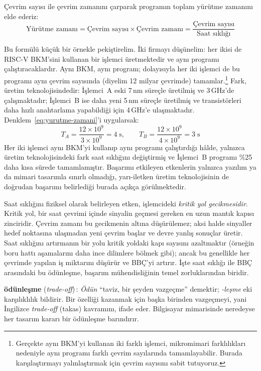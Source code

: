 Çevrim sayısı ile çevrim zamanını çarparak programın toplam yürütme zamanını elde ederiz:
\begin{equation}
\text{Yürütme zamanı} = \text{Çevrim sayısı} \times \text{Çevrim zamanı} = \frac{\text{Çevrim sayısı}}{\text{Saat sıklığı}}
\label{eq:yurutme-zamani}
\end{equation}

Bu formülü küçük bir örnekle pekiştirelim. İki firmayı düşünelim: her ikisi de RISC-V BKM'sini kullanan bir işlemci üretmektedir ve aynı programı çalıştıracaklardır. Aynı BKM, aynı program; dolayısıyla her iki işlemci de bu programı aynı çevrim sayısında (diyelim 12 milyar çevrimde) tamamlar.\footnote{Gerçekte aynı BKM'yi kullanan iki farklı işlemci, mikromimari farklılıkları nedeniyle aynı programı farklı çevrim sayılarında tamamlayabilir. Burada karşılaştırmayı yalınlaştırmak için çevrim sayısını sabit tutuyoruz.} Fark, üretim teknolojisindedir: İşlemci~A eski 7\,nm süreçle üretilmiş ve 3\,GHz'de çalışmaktadır; İşlemci~B ise daha yeni 5\,nm süreçle üretilmiş ve transistörleri daha hızlı anahtarlama yapabildiği için 4\,GHz'e ulaşmaktadır. Denklem~\ref{eq:yurutme-zamani}'i uygularsak:
%
\[
T_A = \frac{12 \times 10^9}{3 \times 10^9} = 4\;\text{s}, \qquad
T_B = \frac{12 \times 10^9}{4 \times 10^9} = 3\;\text{s}
\]
%
Her iki işlemci aynı BKM'yi kullanıp aynı programı çalıştırdığı hâlde, yalnızca üretim teknolojisindeki fark saat sıklığını değiştirmiş ve İşlemci~B programı \%25 daha kısa sürede tamamlamıştır. Başarımı etkileyen etkenlerin yalnızca yazılım ya da mimari tasarımla sınırlı olmadığı, yarı-iletken üretim teknolojisinin de doğrudan başarımı belirlediği burada açıkça görülmektedir.

Saat sıklığını fiziksel olarak belirleyen etken, işlemcideki \emph{kritik yol gecikmesidir}. Kritik yol, bir saat çevrimi içinde sinyalin geçmesi gereken en uzun mantık kapısı zinciridir. Çevrim zamanı bu gecikmenin altına düşürülemez; aksi halde sinyaller hedef noktasına ulaşmadan yeni çevrim başlar ve devre yanlış sonuçlar üretir. Saat sıklığını artırmanın bir yolu kritik yoldaki kapı sayısını azaltmaktır (örneğin boru hattı aşamalarını daha ince dilimlere bölmek gibi); ancak bu genellikle her çevrimde yapılan iş miktarını düşürür ve BBÇ'yi artırır. İşte saat sıklığı ile BBÇ arasındaki bu ödünleşme, başarım mühendisliğinin temel zorluklarından biridir.

\begin{terimnotu}
\textbf{ödünleşme} (\emph{trade-off})\,: \emph{Ödün} ``taviz, bir şeyden vazgeçme'' demektir; \emph{-leşme} eki karşılıklılık bildirir. Bir özelliği kazanmak için başka birinden vazgeçmeyi, yani İngilizce \emph{trade-off} (takas) kavramını, ifade eder. Bilgisayar mimarisinde neredeyse her tasarım kararı bir ödünleşme barındırır.
\end{terimnotu}

